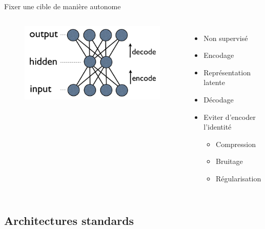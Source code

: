 \documentclass{beamer}
\begin{document}
\begin{frame}{Fixer une cible  de manière autonome}

  \begin{columns}
    \begin{figure}
      \centering
      \includegraphics[scale=0.8]{../Figures/DenseAuto}
    \end{figure}

    \begin{itemize}
    \item Non supervisé\pause
    \item Encodage\pause
    \item Représentation latente \pause
    \item Décodage \pause
    \item Eviter d'encoder l'identité\pause
      \begin{itemize}
      \item Compression\pause
      \item Bruitage\pause
      \item Régularisation
      \end{itemize}
    \end{itemize}
  \end{columns}
\end{frame}

\subsection{Architectures standards}
\end{document}
